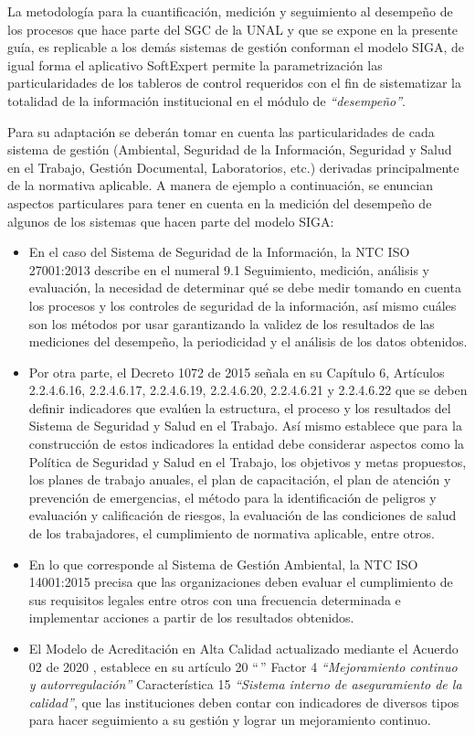 \documentclass[
]{book}
\begin{document}
La metodología para la cuantificación, medición y seguimiento al desempeño de los procesos que hace parte del SGC de la UNAL y que se expone en la presente guía, es replicable a los demás sistemas de gestión conforman el modelo SIGA, de igual forma el aplicativo SoftExpert permite la parametrización las particularidades de los tableros de control requeridos con el fin de sistematizar la totalidad de la información institucional en el módulo de \emph{``desempeño''}.

Para su adaptación se deberán tomar en cuenta las particularidades de cada sistema de gestión (Ambiental, Seguridad de la Información, Seguridad y Salud en el Trabajo, Gestión Documental, Laboratorios, etc.) derivadas principalmente de la normativa aplicable. A manera de ejemplo a continuación, se enuncian aspectos particulares para tener en cuenta en la medición del desempeño de algunos de los sistemas que hacen parte del modelo SIGA:

\begin{itemize}
\item
  En el caso del Sistema de Seguridad de la Información, la NTC ISO 27001:2013 \citet{ri2014tecnologia} describe en el numeral 9.1 Seguimiento, medición, análisis y evaluación, la necesidad de determinar qué se debe medir tomando en cuenta los procesos y los controles de seguridad de la información, así mismo cuáles son los métodos por usar garantizando la validez de los resultados de las mediciones del desempeño, la periodicidad y el análisis de los datos obtenidos.
\item
  Por otra parte, el Decreto 1072 de 2015 \citet{de2015decreto} señala en su Capítulo 6, Artículos 2.2.4.6.16, 2.2.4.6.17, 2.2.4.6.19, 2.2.4.6.20, 2.2.4.6.21 y 2.2.4.6.22 que se deben definir indicadores que evalúen la estructura, el proceso y los resultados del Sistema de Seguridad y Salud en el Trabajo. Así mismo establece que para la construcción de estos indicadores la entidad debe considerar aspectos como la Política de Seguridad y Salud en el Trabajo, los objetivos y metas propuestos, los planes de trabajo anuales, el plan de capacitación, el plan de atención y prevención de emergencias, el método para la identificación de peligros y evaluación y calificación de riesgos, la evaluación de las condiciones de salud de los trabajadores, el cumplimiento de normativa aplicable, entre otros.
\item
  En lo que corresponde al Sistema de Gestión Ambiental, la NTC ISO 14001:2015 \citet{cubana2004sistemas} precisa que las organizaciones deben evaluar el cumplimiento de sus requisitos legales entre otros con una frecuencia determinada e implementar acciones a partir de los resultados obtenidos.
\item
  El Modelo de Acreditación en Alta Calidad actualizado mediante el Acuerdo 02 de 2020 , establece en su artículo 20 ``\,'' Factor 4 \emph{``Mejoramiento continuo y autorregulación''} Característica 15 \emph{``Sistema interno de aseguramiento de la calidad''}, que las instituciones deben contar con indicadores de diversos tipos para hacer seguimiento a su gestión y lograr un mejoramiento continuo.
\end{itemize}
\end{document}

